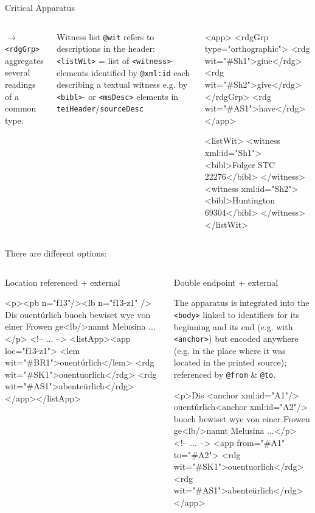\begin{frame}{Critical Apparatus}
\begin{columns}
$\to$ \texttt{<rdgGrp>} aggregates several readings of a common type.

\begin{block}{Witness list}
\texttt{@wit} refers to descriptions in the header: 
\texttt{<listWit>} = list of \texttt{<witness>}-elements identified by \texttt{@xml:id} each describing a textual witness e.g. by \texttt{<bibl>}- or \texttt{<msDesc>} elements in \texttt{teiHeader}/\texttt{sourceDesc}
\end{block}

\begin{xmlcode}
<app>
    <rdgGrp type="orthographic">
        <rdg wit="#Sh1">giue</rdg>
        <rdg wit="#Sh2">give</rdg>
    </rdgGrp>
    <rdg wit="#AS1">have</rdg>
</app>

<listWit>
    <witness xml:id="Sh1">
  <bibl>Folger STC 22276</bibl>
    </witness>
    <witness xml:id="Sh2">
  <bibl>Huntington 69304</bibl>
    </witness>
</listWit>
\end{xmlcode}

\end{columns}

\framebreak


There are different options:
\begin{columns}
\begin{block}{Location referenced + external}
\begin{xmlcode}
<p><pb n="f13"/><lb n="f13-z1" /> 
Dis ouentúrlich buoch bewiset wye 
von einer Frowen ge<lb/>nannt 
Melusina ...</p>
<!-- ... -->
<listApp><app loc="f13-z1">
    <lem wit="#BR1">ouentúrlich</lem>
    <rdg wit="#SK1">ouentuorlich</rdg>
    <rdg wit="#AS1">abenteürlich</rdg>
</app></listApp>
\end{xmlcode}
\end{block}



\begin{block}{Double endpoint + external}\footnotesize

The apparatus is integrated into the \texttt{<body>} linked to identifiers for its beginning and its end (e.g. with \texttt{<anchor>}) but encoded anywhere (e.g. in the place where it was located in the printed source); referenced by \texttt{@from} \& \texttt{@to}.

\begin{xmlcode}
<p>Dis <anchor xml:id="A1"/>
ouentúrlich<anchor xml:id="A2"/> buoch
    bewiset wye von einer 
    Frowen ge<lb/>nannt Melusina 
    ...</p>
<!-- ... -->
<app from="#A1" to="#A2">
    <rdg wit="#SK1">ouentuorlich</rdg>
    <rdg wit="#AS1">abenteürlich</rdg>
</app>
\end{xmlcode}
\end{block}


\end{columns}
\end{frame}
